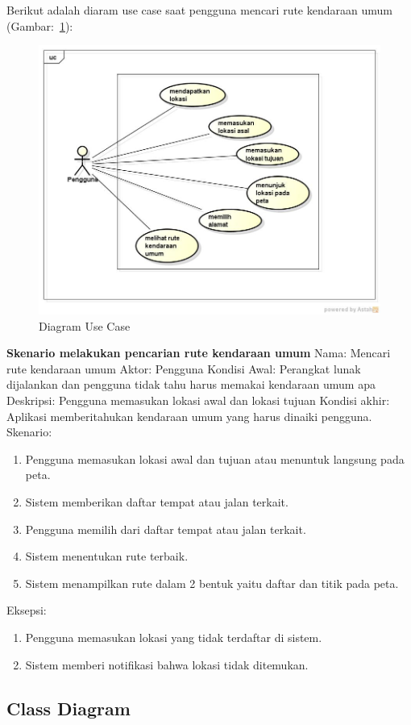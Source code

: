 Berikut adalah diaram use case saat pengguna mencari rute kendaraan umum (Gambar:~\ref{fig:UseCase}):
\begin{figure}[h]
	\centering
		\includegraphics[scale=0.5]{Gambar/useCase_dan_Class/UseCase}
	\caption{Diagram Use Case}
	\label{fig:UseCase}
\end{figure}

\textbf{Skenario melakukan pencarian rute kendaraan umum}
Nama: Mencari rute kendaraan umum
Aktor: Pengguna
Kondisi Awal: Perangkat lunak dijalankan dan pengguna tidak tahu harus memakai kendaraan umum apa
Deskripsi: Pengguna memasukan lokasi awal dan lokasi tujuan
Kondisi akhir: Aplikasi memberitahukan kendaraan umum yang harus dinaiki pengguna.
Skenario:
\begin{enumerate}
	\item Pengguna memasukan lokasi awal dan tujuan atau menuntuk langsung pada peta.
	\item Sistem memberikan daftar tempat atau jalan terkait.
	\item Pengguna memilih dari daftar tempat atau jalan terkait.
	\item Sistem menentukan rute terbaik.
	\item Sistem menampilkan rute dalam 2 bentuk yaitu daftar dan titik pada peta.
\end{enumerate}
Eksepsi:
\begin{enumerate}
	\item Pengguna memasukan lokasi yang tidak terdaftar di sistem.
	\item Sistem memberi notifikasi bahwa lokasi tidak ditemukan.
\end{enumerate}

\subsection{Class Diagram}
\label{lab:Class Diagram}